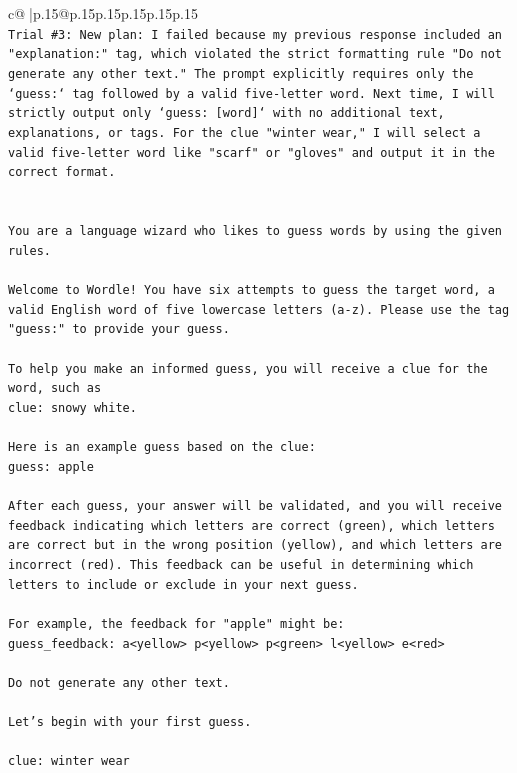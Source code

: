 \documentclass{article}
\begin{document}
{\begin{supertabular}{c@{$\;$}|p{.15\linewidth}@{}p{.15\linewidth}p{.15\linewidth}p{.15\linewidth}p{.15\linewidth}p{.15\linewidth}}
{{{\\ 
\texttt{Trial \#3: New plan: I failed because my previous response included an "explanation:" tag, which violated the strict formatting rule "Do not generate any other text." The prompt explicitly requires only the `guess:` tag followed by a valid five{-}letter word. Next time, I will strictly output only `guess: {[}word{]}` with no additional text, explanations, or tags. For the clue "winter wear," I will select a valid five{-}letter word like "scarf" or "gloves" and output it in the correct format.} \\
\\ 
\\ 
\texttt{You are a language wizard who likes to guess words by using the given rules.} \\
\\ 
\texttt{Welcome to Wordle! You have six attempts to guess the target word, a valid English word of five lowercase letters (a{-}z). Please use the tag "guess:" to provide your guess.} \\
\\ 
\texttt{To help you make an informed guess, you will receive a clue for the word, such as} \\
\texttt{clue: snowy white.} \\
\\ 
\texttt{Here is an example guess based on the clue: } \\
\texttt{guess: apple} \\
\\ 
\texttt{After each guess, your answer will be validated, and you will receive feedback indicating which letters are correct (green), which letters are correct but in the wrong position (yellow), and which letters are incorrect (red). This feedback can be useful in determining which letters to include or exclude in your next guess.} \\
\\ 
\texttt{For example, the feedback for "apple" might be:} \\
\texttt{guess\_feedback: a<yellow> p<yellow> p<green> l<yellow> e<red>} \\
\\ 
\texttt{Do not generate any other text.} \\
\\ 
\texttt{Let's begin with your first guess.} \\
\\ 
\texttt{clue: winter wear} \\
            }
        }
    }
     \\ \\


\end{supertabular}}
\end{document}
